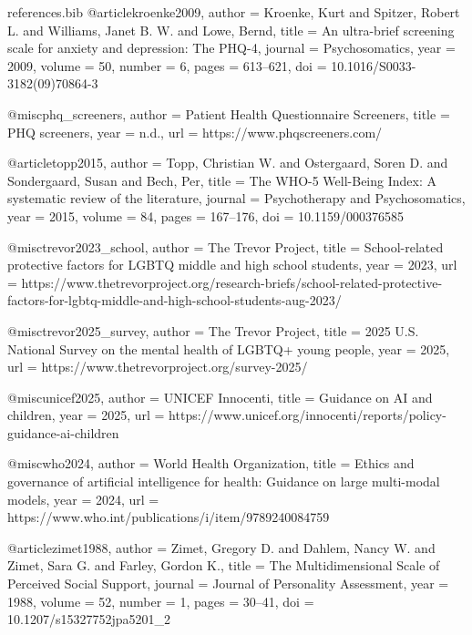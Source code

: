 \begin{filecontents*}{references.bib}
@article{kroenke2009,
  author = {Kroenke, Kurt and Spitzer, Robert L. and Williams, Janet B. W. and Lowe, Bernd},
  title = {An ultra-brief screening scale for anxiety and depression: The {PHQ-4}},
  journal = {Psychosomatics},
  year = {2009},
  volume = {50},
  number = {6},
  pages = {613--621},
  doi = {10.1016/S0033-3182(09)70864-3}
}

@misc{phq_screeners,
  author = {{Patient Health Questionnaire Screeners}},
  title = {{PHQ} screeners},
  year = {n.d.},
  url = {https://www.phqscreeners.com/}
}

@article{topp2015,
  author = {Topp, Christian W. and Ostergaard, Soren D. and Sondergaard, Susan and Bech, Per},
  title = {The {WHO-5} Well-Being Index: A systematic review of the literature},
  journal = {Psychotherapy and Psychosomatics},
  year = {2015},
  volume = {84},
  pages = {167--176},
  doi = {10.1159/000376585}
}

@misc{trevor2023_school,
  author = {{The Trevor Project}},
  title = {School-related protective factors for {LGBTQ} middle and high school students},
  year = {2023},
  url = {https://www.thetrevorproject.org/research-briefs/school-related-protective-factors-for-lgbtq-middle-and-high-school-students-aug-2023/}
}

@misc{trevor2025_survey,
  author = {{The Trevor Project}},
  title = {2025 {U.S. National Survey} on the mental health of {LGBTQ+} young people},
  year = {2025},
  url = {https://www.thetrevorproject.org/survey-2025/}
}

@misc{unicef2025,
  author = {{UNICEF Innocenti}},
  title = {Guidance on {AI} and children},
  year = {2025},
  url = {https://www.unicef.org/innocenti/reports/policy-guidance-ai-children}
}

@misc{who2024,
  author = {{World Health Organization}},
  title = {Ethics and governance of artificial intelligence for health: Guidance on large multi-modal models},
  year = {2024},
  url = {https://www.who.int/publications/i/item/9789240084759}
}

@article{zimet1988,
  author = {Zimet, Gregory D. and Dahlem, Nancy W. and Zimet, Sara G. and Farley, Gordon K.},
  title = {The Multidimensional Scale of Perceived Social Support},
  journal = {Journal of Personality Assessment},
  year = {1988},
  volume = {52},
  number = {1},
  pages = {30--41},
  doi = {10.1207/s15327752jpa5201_2}
}
\end{filecontents*}

\documentclass[stu,12pt,floatsintext]{apa7}

